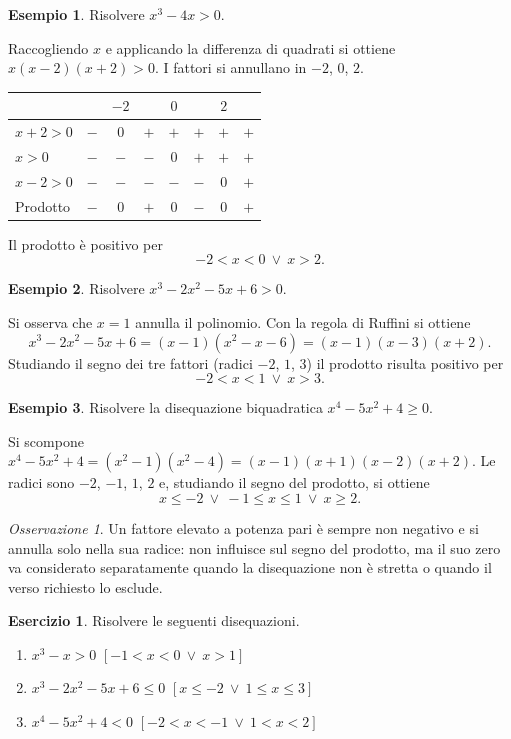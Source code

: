 \documentclass[12pt,a4paper,openany]{book}
\theoremstyle{definition}
\newtheorem{esempio}{Esempio}[section]
\newtheorem{esercizio}{Esercizio}[section]
\theoremstyle{plain}
\theoremstyle{remark}
\newtheorem*{osservazione}{Osservazione}
\begin{document}
\begin{esempio}
Risolvere $x^3-4x>0$.

Raccogliendo $x$ e applicando la differenza di quadrati si ottiene $x(x-2)(x+2)>0$. I fattori si annullano in $-2$, $0$, $2$.
\begin{center}
\renewcommand{\arraystretch}{1.3}
\begin{tabular}{l|ccccccc}
 & & $-2$ & & $0$ & & $2$ & \\
\hline
$x+2>0$ & $-$ & $0$ & $+$ & $+$ & $+$ & $+$ & $+$ \\
$x>0$ & $-$ & $-$ & $-$ & $0$ & $+$ & $+$ & $+$ \\
$x-2>0$ & $-$ & $-$ & $-$ & $-$ & $-$ & $0$ & $+$ \\
\hline
Prodotto & $-$ & $0$ & $+$ & $0$ & $-$ & $0$ & $+$ \\
\end{tabular}
\end{center}
Il prodotto è positivo per
\[
-2<x<0\ \lor\ x>2.
\]
\end{esempio}

\begin{esempio}
Risolvere $x^3-2x^2-5x+6>0$.

Si osserva che $x=1$ annulla il polinomio. Con la regola di Ruffini si ottiene
\[
x^3-2x^2-5x+6=(x-1)(x^2-x-6)=(x-1)(x-3)(x+2).
\]
Studiando il segno dei tre fattori (radici $-2$, $1$, $3$) il prodotto risulta positivo per
\[
-2<x<1\ \lor\ x>3.
\]
\end{esempio}

\begin{esempio}
Risolvere la disequazione biquadratica $x^4-5x^2+4\ge 0$.

Si scompone $x^4-5x^2+4=(x^2-1)(x^2-4)=(x-1)(x+1)(x-2)(x+2)$. Le radici sono $-2$, $-1$, $1$, $2$ e, studiando il segno del prodotto, si ottiene
\[
x\le -2\ \lor\ -1\le x\le 1\ \lor\ x\ge 2.
\]
\end{esempio}

\begin{osservazione}
Un fattore elevato a potenza pari è sempre non negativo e si annulla solo nella sua radice: non influisce sul segno del prodotto, ma il suo zero va considerato separatamente quando la disequazione non è stretta o quando il verso richiesto lo esclude.
\end{osservazione}

\begin{esercizio}
Risolvere le seguenti disequazioni.
\begin{enumerate}[label=\alph*)]
\item $x^3-x>0$ \hfill $[-1<x<0\ \lor\ x>1]$
\item $x^3-2x^2-5x+6\le 0$ \hfill $[x\le -2\ \lor\ 1\le x\le 3]$
\item $x^4-5x^2+4<0$ \hfill $[-2<x<-1\ \lor\ 1<x<2]$
\end{enumerate}
\end{esercizio}
\end{document}
